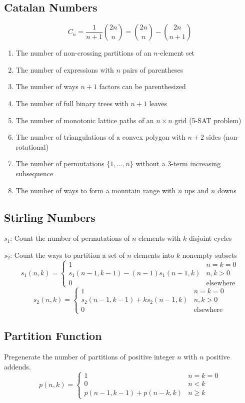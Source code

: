 \documentclass[8pt,a4paper,landscape,oneside]{amsart}
\begin{document}
\begin{multicols*}{3}
  \subsection{Catalan Numbers}
    \[
        C_n = \frac{1}{n+1}\binom{2n}{n} =  \binom{2n}{n}-\binom{2n}{n+1}
    \]
    \begin{enumerate}
      \item The number of non-crossing partitions of an $n$-element set
      \item The number of expressions with $n$ pairs of parentheses
      \item The number of ways $n+1$ factors can be parenthesized
      \item The number of full binary trees with $n+1$ leaves
      \item The number of monotonic lattice paths of an $n \times n$ grid (5-SAT problem)
      \item The number of triangulations of a convex polygon with $n+2$ sides (non-rotational)
      \item The number of permutations $\{1, \ldots, n\}$ without a 3-term increasing subsequence
      \item The number of ways to form a mountain range with $n$ ups and $n$ downs
    \end{enumerate}
  \subsection{Stirling Numbers}
    $s_1$: Count the number of permutations of $n$ elements with $k$ disjoint cycles

    $s_2$: Count the ways to partition a set of $n$ elements into $k$ nonempty subsets
    \[
    s_1(n,k) = \begin{cases}
        1 & n = k = 0 \\
        s_1(n-1,k-1) - (n-1) s_1(n-1,k) & n,k>0 \\
        0 & \text{elsewhere}
    \end{cases}
    \]
    \[
    s_2(n,k) = \begin{cases}
        1 & n = k = 0 \\
        s_2(n-1,k-1) + k s_2(n-1,k) & n,k>0 \\
        0 & \text{elsewhere}
    \end{cases}
    \]
  \subsection{Partition Function}
    Pregenerate the number of partitions of positive integer $n$ with $n$ positive addends.
    \[
    p(n,k) = \begin{cases}
        1 & n = k = 0 \\
        0 & n < k \\
        p(n-1,k-1) + p(n-k,k) & n \ge k
    \end{cases}
    \]

\end{multicols*}
\end{document}
